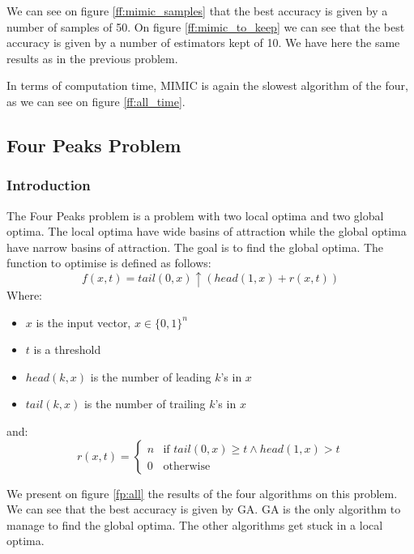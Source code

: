 \documentclass[10pt]{article}
\begin{document}
				We can see on figure \ref{ff:mimic_samples} that the best accuracy is given by a number of samples of 50. On figure \ref{ff:mimic_to_keep} we can see that the best accuracy is given by a number of estimators kept of 10. We have here the same results as in the previous problem.

				In terms of computation time, MIMIC is again the slowest algorithm of the four, as we can see on figure \ref{ff:all_time}.
		\subsection{Four Peaks Problem}
			\subsubsection*{Introduction}
				The Four Peaks problem is a problem with two local optima and two global optima. The local optima have wide basins of attraction while the global optima have narrow basins of attraction. The goal is to find the global optima. The function to optimise is defined as follows:
				\begin{equation}
					f(x, t) = tail(0, x) \uparrow (head(1, x) + r(x, t))
				\end{equation}
				Where:
				\begin{itemize}
					\item $x$ is the input vector, $x \in \{0, 1\}^n$
					\item $t$ is a threshold
					\item $head(k, x)$ is the number of leading $k$'s in $x$
					\item $tail(k, x)$ is the number of trailing $k$'s in $x$
				\end{itemize}
				and:
				\begin{equation}
					r(x, t) = \begin{cases}
						n & \text{if } tail(0, x) \geq t \land head(1, x) > t \\
						0 & \text{otherwise}
					\end{cases}
				\end{equation}

				We present on figure \ref{fp:all} the results of the four algorithms on this problem. We can see that the best accuracy is given by GA. GA is the only algorithm to manage to find the global optima. The other algorithms get stuck in a local optima.
\end{document}
